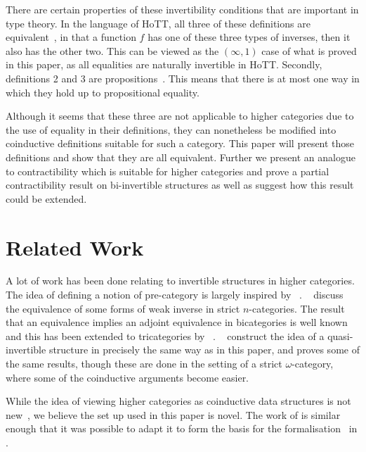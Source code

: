 \documentclass[draft]{article}
\theoremstyle{definition} \newtheorem{definition}{Definition}
\theoremstyle{remark} \newtheorem{remark}{Remark}
\begin{document}
There are certain properties of these invertibility conditions that
are important in type theory. In the language of HoTT, all three of
these definitions are equivalent~\cite[Corollary 4.3.3]{hottbook}, in
that a function \(f\) has one of these three types of inverses, then
it also has the other two. This can be viewed as the \((\infty,1)\)
case of what is proved in this paper, as all equalities are naturally
invertible in HoTT. Secondly, definitions 2 and 3 are
propositions~\cite[Theorem 4.2.13, Theorem 4.3.2]{hottbook}. This
means that there is at most one way in which they hold up to
propositional equality.

Although it seems that these three are not applicable to higher
categories due to the use of equality in their definitions, they can
nonetheless be modified into coinductive definitions suitable for such
a category. This paper will present those definitions and show that
they are all equivalent. Further we present an analogue to
contractibility which is suitable for higher categories and prove a
partial contractibility result on bi-invertible structures as well as
suggest how this result could be extended.

\section{Related Work}\label{sec:related}

A lot of work has been done relating to invertible structures in
higher categories. The idea of defining a notion of pre-category is
largely inspired by \citeauthor{Cheng2007}~\cite{Cheng2007}.
\citeauthor{kansangian2009weak}~\cite{kansangian2009weak} discuss the
equivalence of some forms of weak inverse in strict \(n\)-categories.
The result that an equivalence implies an adjoint equivalence in
bicategories is well known and this has been extended to tricategories
by
\citeauthor{gurski2012biequivalences}~\cite{gurski2012biequivalences}.
\citeauthor*{lafont2010folk}~\cite{lafont2010folk} construct the idea
of a quasi-invertible structure in precisely the same way as in this
paper, and proves some of the same results, though these are done in
the setting of a strict \(\omega\)-category, where some of the
coinductive arguments become easier.

While the idea of viewing higher categories as coinductive data
structures is not
new~\cite{cheng2012weak,hirschowitz_et_al:LIPIcs:2015:5166}, we
believe the set up used in this paper is novel. The work of
\citeauthor{hirschowitz_et_al:LIPIcs:2015:5166} is similar enough that
it was possible to adapt it to form the basis for the
formalisation~\cite{rice_agda} in .
\end{document}
